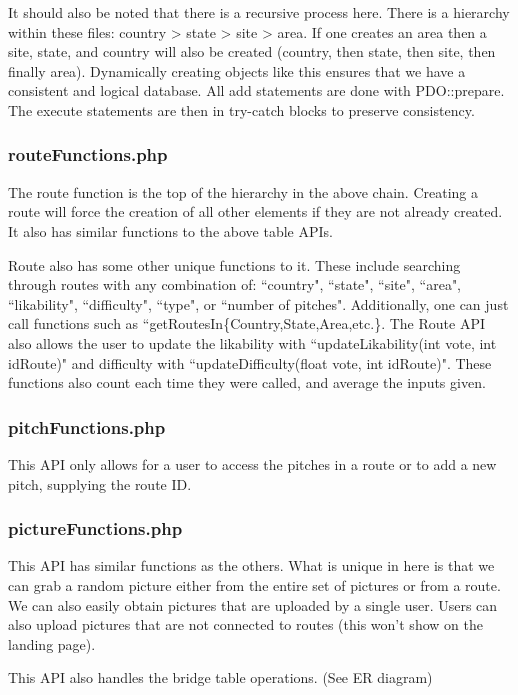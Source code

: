\documentclass[12pt,letter]{article}
\begin{document}
It should also be noted that there is a recursive process here. There is a
hierarchy within these files: country > state > site > area. If one creates an
area then a site, state, and country will also be created (country, then state,
then site, then finally area). Dynamically creating objects like this ensures
that we have a consistent and logical database. All add statements are done with
PDO::prepare. The execute statements are then in try-catch blocks to preserve
consistency.

\subsubsection{routeFunctions.php}
The route function is the top of the hierarchy in the above chain. Creating a
route will force the creation of all other elements if they are not already
created. It also has similar functions to the above table APIs. 

Route also has some other unique functions to it. These include searching
through routes with any combination of: ``country", ``state", ``site", ``area",
``likability", ``difficulty", ``type", or ``number of pitches". Additionally,
one can just call functions such as ``getRoutesIn\{Country,State,Area,etc.\}.
The Route API also allows the user to update the likability with
``updateLikability(int vote, int idRoute)" and difficulty with
``updateDifficulty(float vote, int idRoute)". These functions also count each
time they were called, and average the inputs given. 

\subsubsection{pitchFunctions.php}
This API only allows for a user to access the pitches in a route or to add a new
pitch, supplying the route ID. 

\subsubsection{pictureFunctions.php}
This API has similar functions as the others. What is unique in here is that we
can grab a random picture either from the entire set of pictures or from a
route. We can also easily obtain pictures that are uploaded by a single user.
Users can also upload pictures that are not connected to routes (this won't show
on the landing page).

This API also handles the bridge table operations. (See ER diagram)
\end{document}
